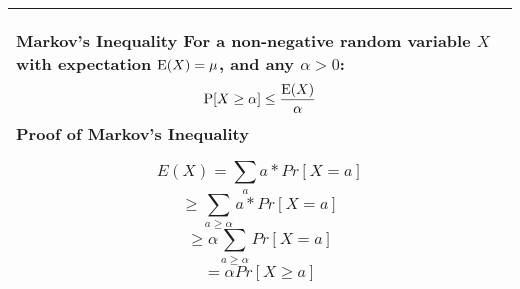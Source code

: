 {\tabulinesep=1mm
\begin{tabu}{|p{16cm} |}
\hline
\vspace{2 mm}
\textbf{Markov's Inequality } \newline
For a non-negative random variable $X$ with expectation $\text{E}(X) = \mu$, 
and any  $\alpha > 0$:
\[\text{P}[X \geq \alpha] \leq \frac{\text{E}(X)}{\alpha}\]
\vspace{2 mm}
\textbf{Proof of Markov's Inequality}\newline

\[E(X) = \sum_a a * Pr[X = a] \]
\[\geq \sum_{a \geq \alpha} a *  Pr[X = a] \]
\[\geq \alpha \sum_{a \geq \alpha} Pr[X = a] \]
\[= \alpha Pr[X \geq a]\]
\vspace{2 mm}
\\
\hline
\end{tabu}
}

